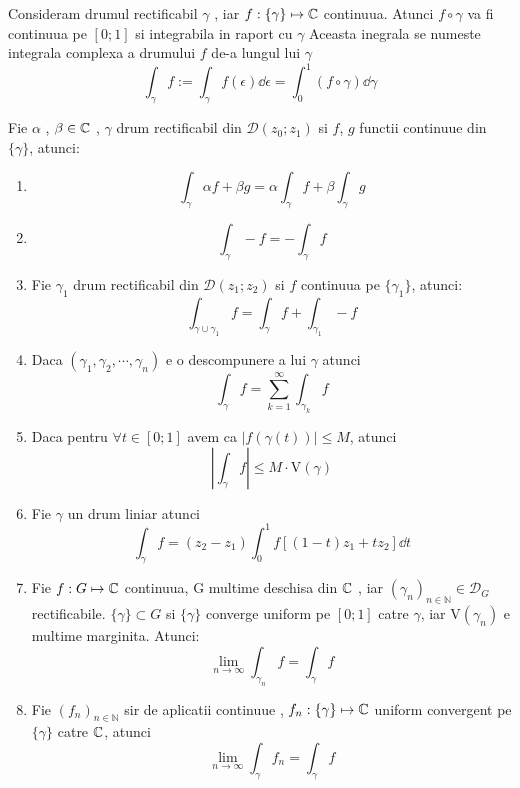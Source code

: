\begin{definition}
    Consideram drumul rectificabil $\gamma$ , iar $f:\{\gamma\} \mapsto \mathbb{C}$ continuua.
    Atunci $f \circ \gamma$ va fi continuua pe $[0;1]$ si integrabila in raport cu $\gamma$
    Aceasta inegrala se numeste integrala complexa a drumului $f$ de-a lungul lui $\gamma$
    \begin{equation}
        \int_{\gamma} f := \int_{\gamma} f(\epsilon) \dd \epsilon = \int_0^1 (f \circ \gamma) \dd \gamma
    \end{equation}
\end{definition}

\begin{theorem}
    Fie $\alpha$ , $\beta \in \mathbb{C}$ , $\gamma$ drum rectificabil din $\mathcal{D}(z_0;z_1)$
    si $f$, $g$ functii continuue din $\{\gamma\}$, atunci:
    \begin{enumerate}
        \item
            \[
                \int_{\gamma} \alpha f + \beta g  = \alpha \int_{\gamma} f + \beta \int_{\gamma} g
            \]
        \item
            \[
                \int_{\gamma} -f = -\int_{\gamma} f
            \]
        \item Fie $\gamma_1$ drum rectificabil din $\mathcal{D}(z_1;z_2)$ si $f$ continuua pe
            $\{\gamma_1\}$, atunci:
            \[
                \int_{\gamma \cup \gamma_1} f = \int_{\gamma} f + \int_{\gamma_1} -f
            \]
        \item Daca $(\gamma_1, \gamma_2, \cdots, \gamma_n)$ e o descompunere a lui $\gamma$ atunci
            \[
                \int_{\gamma} f = \sum_{k=1}^{\infty} \int_{\gamma_k} f
            \]
        \item Daca pentru $\forall t \in [0;1]$ avem ca $|f(\gamma(t))| \leq M$, atunci
            \[
                \left | \int_{\gamma} f \right | \leq M \cdot \mathrm{V}(\gamma)
            \]
        \item Fie $\gamma$ un drum liniar atunci
            \[
                 \int_{\gamma} f = (z_2 -z_1) \int_0^1 f[(1-t)z_1 + tz_2] \dd t
            \]
        \item Fie $f:G\mapsto \mathbb{C}$ continuua, G multime deschisa din $\mathbb{C}$ ,
            iar $(\gamma_n)_{n\in\mathbb{N}} \in \mathcal{D}_G$ rectificabile.
            $\{\gamma\} \subset G$ si $\{\gamma\}$ converge uniform pe $[0;1]$ catre $\gamma$, iar
            $\mathrm{V}(\gamma_n)$ e multime marginita. Atunci:
            \[
                \lim_{n\to \infty} \int_{\gamma_n} f = \int_{\gamma} f
            \]
        \item Fie $(f_n)_{n\in\mathbb{N}}$ sir de aplicatii continuue ,
            $f_n : \{\gamma\} \mapsto \mathbb{C}$ uniform convergent pe $\{\gamma\}$ catre $\mathbb{C}$, atunci
            \[
                \lim_{n\to\infty} \int_{\gamma} f_n = \int_{\gamma} f
            \]
    \end{enumerate}
\end{theorem}

